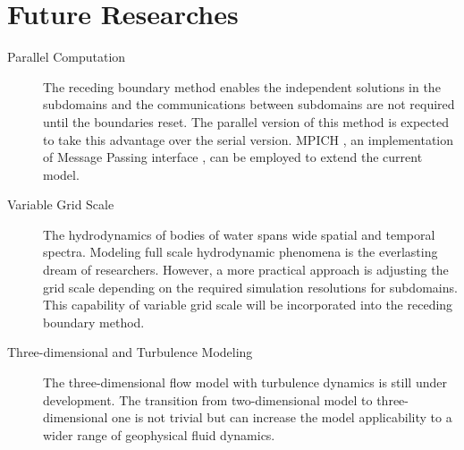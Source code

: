 \section{Future Researches}

\begin{description}

\item [Parallel Computation]

The receding boundary method enables the independent solutions in the subdomains and the communications between subdomains are not required until the boundaries reset. The parallel version of this method is expected to take this advantage over the serial version. MPICH \cite{Gropp1996, MPICH2}, an implementation of Message Passing interface \cite{MPI1995}, can be employed to extend the current model.

\item [Variable Grid Scale]

The hydrodynamics of bodies of water spans wide spatial and temporal spectra. Modeling full scale hydrodynamic phenomena is the everlasting dream of researchers. However, a more practical approach is adjusting the grid scale depending on the required simulation resolutions for subdomains. This capability of variable grid scale will be incorporated into the receding boundary method.

\item [Three-dimensional and Turbulence Modeling]

The three-dimensional flow model with turbulence dynamics is still under development. The transition from two-dimensional model to three-dimensional one is not trivial but can increase the model applicability to a wider range of geophysical fluid dynamics.


\end{description}



